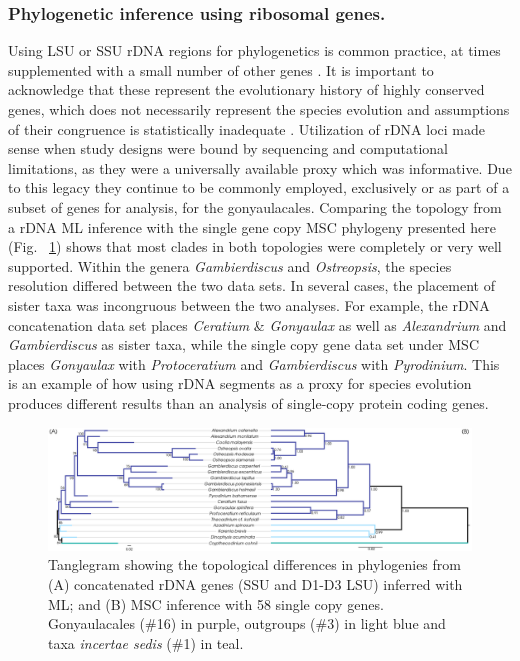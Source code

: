 \documentclass[fleqn,10pt,lineno]{wlpeerj} %
\begin{document}
\subsubsection*{Phylogenetic inference using ribosomal genes.}
Using LSU or SSU rDNA regions for phylogenetics is common practice, at times supplemented with a small number of other genes \citep{shalchian2006combined,zhang2007three,saldarriaga2004molecular,murray2005improving,hoppenrath2010dinoflagellate}. 
It is important to acknowledge that these represent the evolutionary history of highly conserved genes, which does not necessarily represent the species evolution and assumptions of their congruence is statistically inadequate \citep{degnan2009gene}.
Utilization of rDNA loci made sense when study designs were bound by sequencing and computational limitations, as they were a universally available proxy which was informative. 
Due to this legacy they continue to be commonly employed, exclusively or as part of a subset of genes for analysis, for the gonyaulacales. 
Comparing the topology from a rDNA ML inference with the single gene copy MSC phylogeny presented here (Fig. ~\ref{fig:tanglerDNA}) shows that most clades in both topologies were completely or very well supported. 
Within the genera \emph{Gambierdiscus} and \emph{Ostreopsis}, the species resolution differed between the two data sets. 
In several cases, the placement of sister taxa was incongruous between the two analyses. 
For example, the rDNA concatenation data set places \emph{Ceratium} \& \emph{Gonyaulax} as well as \emph{Alexandrium} and \emph{Gambierdiscus} as sister taxa, while the single copy gene data set under MSC places \emph{Gonyaulax} with \emph{Protoceratium} and \emph{Gambierdiscus} with \emph{Pyrodinium}. 
This is an example of how using rDNA segments as a proxy for species evolution produces different results than an analysis of single-copy protein coding genes.

\begin{figure}[ht]
\centering
\includegraphics[width=\linewidth]{gonya-figs/MSC-BI-vs-rDNA-ML.png} 
\caption{Tanglegram showing the topological differences in phylogenies from (A) concatenated rDNA genes (SSU and D1-D3 LSU) inferred with ML; and (B) MSC inference with 58 single copy genes. Gonyaulacales (\#16) in purple, outgroups (\#3) in light blue and taxa \textit{incertae sedis} (\#1) in teal.} 
\label{fig:tanglerDNA}
\end{figure} 
\end{document}
